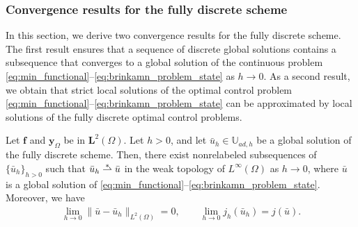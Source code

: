 \documentclass[final]{siamart0216}
\begin{document}
\subsubsection{Convergence results for the fully discrete scheme}

In this section, we derive two convergence results for the fully discrete scheme. The first result ensures that a sequence of discrete global solutions contains a subsequence that converges to a global solution of the continuous problem \eqref{eq:min_functional}--\eqref{eq:brinkamn_problem_state} as $h \rightarrow 0$. As a second result, we obtain that strict local solutions of the optimal control problem \eqref{eq:min_functional}--\eqref{eq:brinkamn_problem_state} can be approximated by local solutions of the fully discrete optimal control problems.

\begin{theorem}
\label{theorem_convergence_global_fully}
Let $\mathbf{f}$ and $\mathbf{y}_{\Omega}$ be in $\mathbf{L}^2(\Omega)$. Let $h>0$, and let $\bar{u}_{h}\in \mathbb{U}_{ad,h}$ be a global solution of the fully discrete scheme. Then, there exist nonrelabeled subsequences of $\{\bar{u}_{h}\}_{h>0}$ such that $\bar{u}_{h}\mathrel{\ensurestackMath{\stackon[1pt]{\rightharpoonup}{\scriptstyle\ast}}} \bar{u}$ in the weak topology of $L^{\infty}(\Omega)$ as $h \rightarrow 0$, where $\bar{u}$ is a global solution of \eqref{eq:min_functional}--\eqref{eq:brinkamn_problem_state}. Moreover, we have
\begin{align}\label{eq:convergence_globalsolutions_fully}
\lim_{h \rightarrow 0} \|\bar{u} - \bar{u}_h\|_{L^2(\Omega)}=0,
\qquad \lim_{h \rightarrow 0} j_h(\bar{u}_{h})=j(\bar{u}).
\end{align}
\end{theorem}
\end{document}
